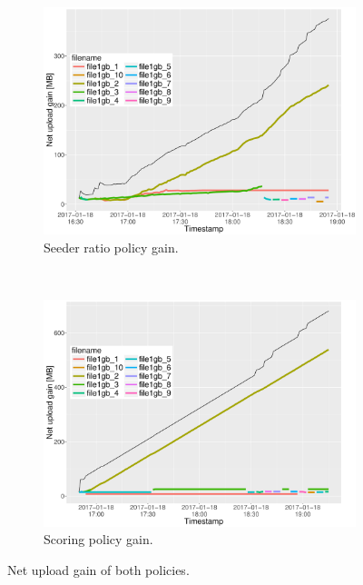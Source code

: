 \begin{figure}[h!]
	\begin{adjustwidth}{-2.5cm}{}
		\begin{subfigure}[t]{0.7\textwidth}
			\centering
			\includegraphics[width=\textwidth]{pics/results/simple1_sr_notrig.pdf}
			\caption{Seeder ratio policy gain.}
			\label{fig:simplesrnotrig}
		\end{subfigure}
		~
		\begin{subfigure}[t]{0.7\textwidth}
			\centering
			\includegraphics[width=\textwidth]{pics/results/simple1_scsr_notrig.pdf}
			\caption{Scoring policy gain.}
			\label{fig:simplescsrnotrig}
		\end{subfigure}
		\caption{Net upload gain of both policies.}
	\end{adjustwidth}
\end{figure}

